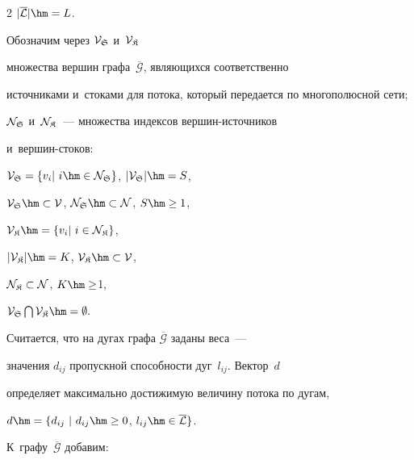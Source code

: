 \begin{multicols}{2}
 $|\overline{\cal L}|\hm = L$.





Обозначим через ${\cal V}_{\frak S}$ и~${\cal V}_{\frak K}$  


множества вершин графа~$\overline {\mathcal{G}}$, являющихся соответственно 


источниками и~стоками для потока, который передается по многополюсной  сети;


${\cal N}_{\frak S}$ и~${\cal N}_{\frak K}$~---  множества индексов вер\-шин-ис\-точ\-ни\-ков 


и~вер\-шин-сто\-ков:


${\cal V}_\SS = \{v_i | \ i \hm\in {\cal N}_\SS \}$,  $|{\cal V}_\SS|\hm = S$,  


${\cal V}_\SS \hm\subset 


{\cal V}$,  ${\cal N}_\SS \hm\subset {\cal N}$, $S \hm\geq 1$, 


${\cal V}_\SK \hm= \{v_i | \ i \in {\cal N}_\SK\}$,   


$|{\cal V}_\SK | \hm= K$, ${\cal V}_\SK \hm\subset {\cal V}$,  


${\cal N}_{\frak K} \subset {\cal N}$, $K \hm\geq $1, 


${\cal V}_\SS \bigcap {\cal V}_\SK \hm= \emptyset.$


Считается, что на дугах графа $\overline {\mathcal{G}}$ заданы веса~--- 


значения $d_{ij}$ пропускной способности дуг~$l_{ij}$. Вектор~$d$ 


определяет максимально достижимую величину потока  по дугам,


$d\hm = \{d_{ij} \ |\  d_{ij} \hm\geq 0$,  $l_{ij}\hm\in \overline{\cal L}\}$.


К~графу~$\overline {\mathcal{G}}$ добавим:


\end{multicols}
